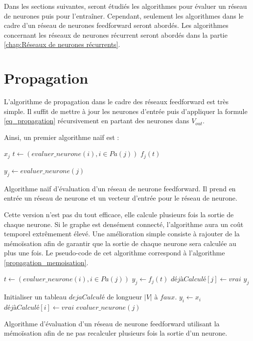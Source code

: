 Dans les sections suivantes, seront étudiés les algorithmes pour évaluer un réseau de neurones puis pour l’entraîner. Cependant, seulement les algorithmes dans le cadre d'un réseau de neurones feedforward seront abordés. Les algorithmes concernant les réseaux de neurones récurrent seront abordés dans la partie \autoref{chap:Réseaux de neurones récurrents}.

\section{Propagation}

L'algorithme de propagation dans le cadre des réseaux feedforward est très simple. Il suffit de mettre à jour les neurones d'entrée puis d'appliquer la formule \ref{eq_propagation} récursivement en partant des neurones dans $V_{out}$.

Ainsi, un premier algorithme naïf est :

\begin{algorithm} 
\begin{algorithmic}
    	\State \Return $x_j$
	\Else
		\State $t \leftarrow (evaluer\_neurone(i), i \in Pa(j))$
		\State \Return $f_j(t)$
	\EndIf
\EndFunction

	\State $y_j \leftarrow evaluer\_neurone(j)$ 
\EndFor
\EndProcedure
\end{algorithmic} 
\caption{Algorithme naïf d'évaluation d'un réseau de neurone feedforward. Il prend en entrée un réseau de neurone et un vecteur d'entrée pour le réseau de neurone.}
\end{algorithm}

Cette version n'est pas du tout efficace, elle calcule plusieurs fois la sortie de chaque neurone. Si le graphe est densément connecté, l'algorithme aura un coût temporel extrêmement élevé. Une amélioration simple consiste à rajouter de la mémoïsation afin de garantir que la sortie de chaque neurone sera calculée au plus une fois. Le pseudo-code de cet algorithme correspond à l'algorithme \ref{propagation_memoisation}.

\begin{algorithm} 
\begin{algorithmic}
		\State $t \leftarrow (evaluer\_neurone(i), i \in Pa(j))$
		\State $y_j \leftarrow f_j(t)$
		\State $déjàCalculé[j] \leftarrow vrai$
	\EndIf
	\State \Return $y_j$
\EndFunction

\State Initialiser un tableau $dejaCalculé$ de longueur $|V|$ à $faux$.
	\State $y_i \leftarrow x_i$
	\State $déjàCalculé[i] \leftarrow vrai$ 
\EndFor
{}
	\State $evaluer\_neurone(j)$ 
\EndFor
\EndProcedure
\end{algorithmic}
\caption{Algorithme d'évaluation d'un réseau de neurone feedforward utilisant la mémoïsation afin de ne pas recalculer plusieurs fois la sortie d'un neurone.}
\label{propagation_memoisation}
\end{algorithm}

